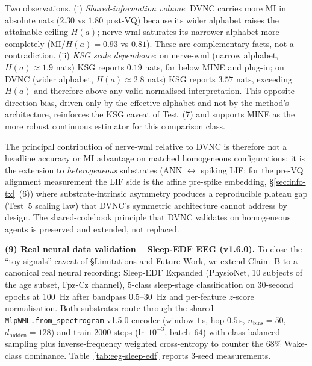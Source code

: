 \documentclass[10pt,twocolumn]{article}
\begin{document}
Two observations. (i) \emph{Shared-information volume}: DVNC
carries more MI in absolute nats ($2.30$ vs $1.80$ post-VQ)
because its wider alphabet raises the attainable ceiling
$H(a)$; nerve-wml saturates its narrower alphabet more
completely ($\mathrm{MI}/H(a) = 0.93$ vs $0.81$). These are
complementary facts, not a contradiction. (ii) \emph{KSG scale
dependence}: on nerve-wml (narrow alphabet, $H(a) \approx 1.9$
nats) KSG reports $0.19$ nats, far below MINE and plug-in; on
DVNC (wider alphabet, $H(a) \approx 2.8$ nats) KSG reports
$3.57$ nats, exceeding $H(a)$ and therefore above any valid
normalised interpretation. This opposite-direction bias,
driven only by the effective alphabet and not by the method's
architecture, reinforces the KSG caveat of Test~(7) and
supports MINE as the more robust continuous estimator for this
comparison class.

The principal contribution of nerve-wml relative to DVNC is
therefore not a headline accuracy or MI advantage on matched
homogeneous configurations: it is the extension to
\emph{heterogeneous} substrates (ANN $\leftrightarrow$ spiking LIF; for the pre-VQ alignment measurement
the LIF side is the affine pre-spike embedding, \S\ref{sec:info-tx}~(6))
where substrate-intrinsic asymmetry produces a reproducible
plateau gap (Test~5 scaling law) that DVNC's symmetric
architecture cannot address by design. The shared-codebook
principle that DVNC validates on homogeneous agents is
preserved and extended, not replaced.

\textbf{(9) Real neural data validation -- Sleep-EDF EEG
(v1.6.0).} To close the ``toy signals'' caveat of \S Limitations and
Future Work, we extend Claim~B to a canonical real
neural recording: Sleep-EDF Expanded (PhysioNet, 10 subjects of
the age subset, Fpz-Cz channel), 5-class sleep-stage
classification on 30-second epochs at 100~Hz after bandpass
0.5--30~Hz and per-feature $z$-score normalisation. Both
substrates route through the shared
\texttt{MlpWML.from\_spectrogram} v1.5.0 encoder
(window $1$\,s, hop $0.5$\,s, $n_{\mathrm{bins}}{=}50$,
$d_{\mathrm{hidden}}{=}128$) and train $2000$ steps
(lr~$10^{-3}$, batch~$64$) with class-balanced sampling plus
inverse-frequency weighted cross-entropy to counter the
$68\%$ Wake-class dominance. Table~\ref{tab:eeg-sleep-edf}
reports 3-seed measurements.
\end{document}

